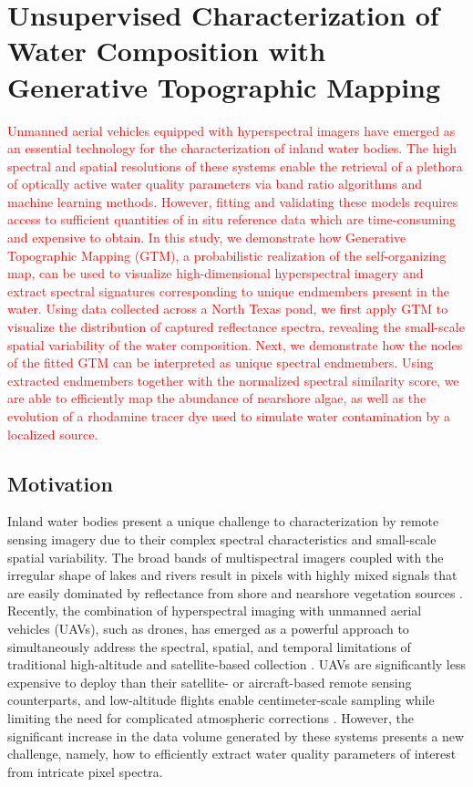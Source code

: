 \chapter{Unsupervised Characterization of Water Composition with Generative Topographic Mapping}\label{ch:robot-team-gtm}

\textcolor{red}{Unmanned aerial vehicles equipped with hyperspectral imagers
  have emerged as an essential technology for the characterization of inland
  water bodies. The high spectral and spatial resolutions of these systems
  enable the retrieval of a plethora of optically active water quality
  parameters via band ratio algorithms and machine learning methods. However,
  fitting and validating these models requires access to sufficient quantities
  of in situ reference data which are time-consuming and expensive to obtain. In
  this study, we demonstrate how Generative Topographic Mapping (GTM), a
  probabilistic realization of the self-organizing map, can be used to visualize
  high-dimensional hyperspectral imagery and extract spectral signatures
  corresponding to unique endmembers present in the water.  Using data collected
  across a North Texas pond, we first apply  GTM to visualize the distribution
  of captured reflectance spectra, revealing the small-scale spatial variability
  of the water composition. Next, we demonstrate how the nodes of the fitted GTM
  can be interpreted as unique spectral endmembers. Using extracted endmembers
  together with the normalized spectral similarity score, we are able to
  efficiently map the abundance of nearshore algae, as well as the evolution of
  a rhodamine tracer dye used to simulate water contamination by a localized
  source. }



\section{Motivation}

Inland water bodies present a unique challenge to characterization by remote sensing imagery due to their complex spectral characteristics and small-scale spatial variability. The broad bands of multispectral imagers coupled with the irregular shape of lakes and rivers result in pixels with highly mixed signals that are easily dominated by reflectance from shore and nearshore vegetation sources \cite{koponen2002lake, ritchie2003remote}. Recently, the combination of hyperspectral imaging with unmanned aerial vehicles (UAVs), such as drones, has emerged as a powerful approach to simultaneously address the spectral, spatial, and temporal limitations of traditional high-altitude and satellite-based collection \cite{adao2017hyperspectral,arroyo2019implementation}. UAVs are significantly less expensive to deploy than their satellite- or aircraft-based remote sensing counterparts, and low-altitude flights enable centimeter-scale sampling while limiting the need for complicated atmospheric corrections \cite{banerjee2020uav}. However, the significant increase in the data volume generated by these systems presents a new challenge, namely, how to efficiently extract water quality parameters of interest from intricate pixel spectra.

